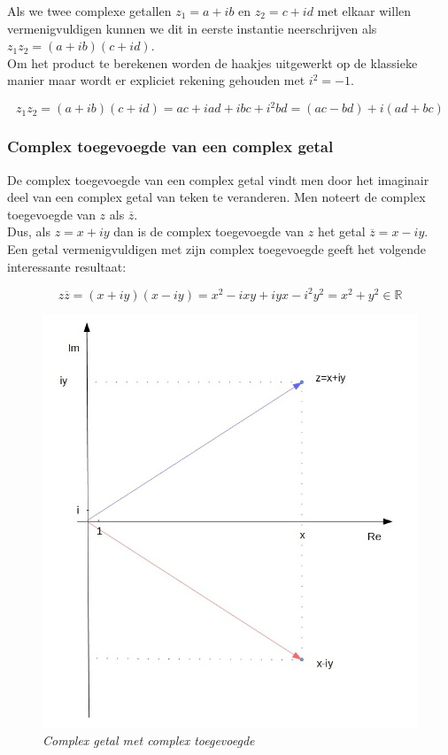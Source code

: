 Als we twee complexe getallen $z_{1}=a+ib$ en $z_{2}=c+id$ met elkaar willen vermenigvuldigen kunnen we dit in eerste instantie neerschrijven als $z_{1} z_{2}=(a+ib)(c+id)$.\\
Om het product te berekenen worden de haakjes uitgewerkt op de klassieke manier maar wordt er expliciet rekening gehouden met $i^2 =-1$.\\

\begin{framed}
\[ z_{1}z_{2}=(a+ib)(c+id)=ac+iad+ibc+i^2 bd=(ac-bd)+i(ad+bc) \]
\end{framed}

\subsubsection{Complex toegevoegde van een complex getal}

De complex toegevoegde van een complex getal vindt men door het imaginair deel van een complex getal van teken te veranderen. Men noteert de complex toegevoegde van $z$ als $\overline{z}$.\\
Dus, als $z=x+iy$ dan is de complex toegevoegde van $z$ het getal $\overline{z}=x-iy$.\\
Een getal vermenigvuldigen met zijn complex toegevoegde geeft het volgende interessante resultaat:

\begin{framed}
\[ z \overline{z}=(x+iy)(x-iy)=x^2 -ixy+iyx-i^2 y^2=x^2 +y^2 \in \mathbb{R} \]
\end{framed}

\begin{figure}[h]
	\begin{center}
		\includegraphics[scale=0.6]{3_gonio_complexe_getallen/inputs/complex-getal-4-complex-toegevoegde.jpg}
	\end{center}
	\caption{\it Complex getal met complex toegevoegde}
\end{figure}

